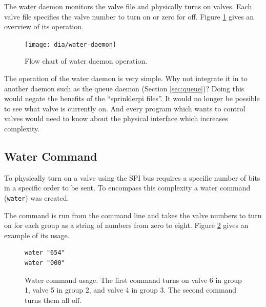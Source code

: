 \documentclass{article}
\begin{document}
The water daemon monitors the valve file and
physically turns on valves.
Each valve file specifies the valve number to turn on or zero for off.
Figure \ref{fig:waterd} gives an overview of its operation.

\begin{figure}[h!]
\begin{center}
\texttt{[image: dia/water-daemon]}
\end{center}
\caption{Flow chart of water daemon operation.}
\label{fig:waterd}
\end{figure}

The operation of the water daemon is very simple.
Why not integrate it in to another daemon such as the queue daemon
(Section \ref{sec:queue})?
Doing this would negate the benefits of the ``sprinklerpi files''.
It would no longer be possible to see what valve is currently on.
And every program which wants to control valves would need to know
about the physical interface which increases complexity.


\clearpage
\FloatBarrier
\subsection{Water Command}
\label{sec:watercmd}

To physically turn on a valve using the SPI bus requires
a specific number of bits in a specific order to be sent.
To encompass this complexity a water command (\verb+water+) was created.

The command is run from the command line and takes the valve numbers to
turn on for each group as a string of numbers from zero to eight.
Figure \ref{fig:watercmd} gives an example of its usage.

\begin{figure}[h!]
\begin{center}
\begin{minipage}{2in}
\begin{verbatim}
water "654"
water "000"
\end{verbatim}
\end{minipage}
\end{center}
\caption{Water command usage.  The first command turns on 
valve 6 in group 1, valve 5 in group 2, and valve 4 in group 3.
The second command turns them all off.}
\label{fig:watercmd}
\end{figure}

\end{document}
